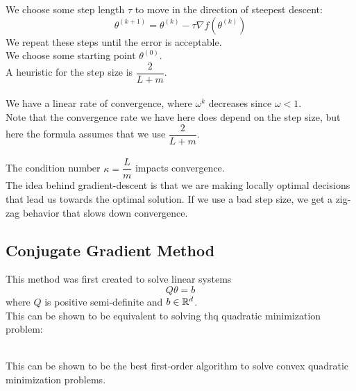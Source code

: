 \documentclass[12pt]{article}
\begin{document}
We choose some step length $\tau$ to move in the direction
of steepest descent:
\[ \theta^{(k+1)} = \theta^{(k)} -\tau \nabla f(\theta^{(k)}) \]
We repeat these steps until the error is acceptable. \\

We choose some starting point $\theta^{(0)}$. \\

A heuristic for the step size is $\dfrac{2}{L + m}$. \\

 \\

We have a linear rate of convergence, where $\omega^k$
decreases since $\omega < 1$. \\
Note that the convergence rate we have
here does depend on the step size, but here the formula
assumes that we use $\dfrac{2}{L + m}$. \\

 \\

The condition number $\kappa = \dfrac{L}{m}$
impacts convergence. \\

The idea behind gradient-descent is that we are making
locally optimal decisions that lead us towards the 
optimal solution. If we use a bad step size, we get a
zig-zag behavior that slows down convergence. \\

\newpage

\subsection*{Conjugate Gradient Method}

This method was first created to solve linear systems
\[ Q\theta = b \]
where $Q$ is positive semi-definite and $b \in \mathbb{R}^d$. \\

This can be shown to be equivalent to solving
thq quadratic minimization problem:

 \\

This can be shown to be the best first-order algorithm
to solve convex quadratic minimization problems. \\

 \\
\end{document}
